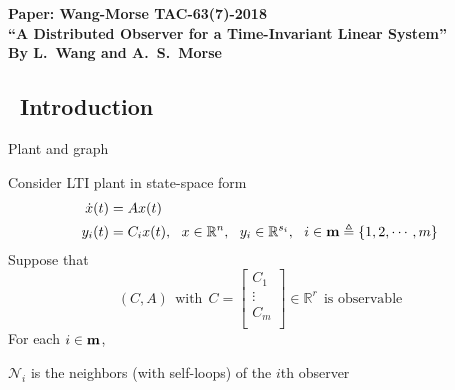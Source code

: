 \documentclass{beamer}
\newcommand{\R}{\mathbb{R}}
\begin{document}
\begin{frame}
\thispagestyle{empty}

\begin{center}
{\large\bf\color{blue}Paper: Wang-Morse TAC-63(7)-2018 \\
{\small ``A Distributed Observer for a Time-Invariant Linear System''} \\
{\small By L.~Wang and A.~S.~Morse}}
\end{center}
\end{frame}



\subsection{~Introduction}%

\begin{frame}{\color{blue} Plant and graph}

Consider LTI plant in state-space form
\begin{align*}
\dot{x}(t)&=A x(t) \\
y_{i}(t)&=C_{i}x(t),~~ x\in\R^{n},~~ y_{i}\in\R^{s_{i}},~~ i\in{\bf m}\triangleq \{1,2,\cdots,m\}
\end{align*}
Suppose that
\begin{equation*}
(C,A) ~~\text{with}~~ C=\begin{bmatrix} C_{1} \\ \vdots \\ C_{m} \\   \end{bmatrix}\in\R^{r} ~~\text{is observable}
\end{equation*}
For each $i\in{\bf m}$,
\begin{center}
$\mathcal{N}_{i}$ is the neighbors (with self-loops) of the $i$th observer
\end{center}
\end{frame}
\end{document}
